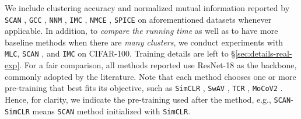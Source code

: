\documentclass[10pt,twocolumn,letterpaper]{article}
\newcommand{\ours}{MLC}
\newcommand{\mours}{\texttt{\ours}}
\begin{document}
   
    We include clustering accuracy and normalized mutual information reported by \texttt{SCAN} \cite{Van_Gansbeke2020-eo}, \texttt{GCC} \cite{Zhong2021-gl}, \texttt{NNM} \cite{Dang2021-no}, \texttt{IMC} \cite{Ntelemis2021-gz}, \texttt{NMCE} \cite{Li2022-vq}, \texttt{SPICE} \cite{Niu2022-iq} on aforementioned datasets whenever applicable. In addition, to \textit{compare the running time} as well as to have more baseline methods when there are \textit{many clusters}, we conduct experiments with \mours{}, \texttt{SCAN} \cite{Van_Gansbeke2020-eo}, and \texttt{IMC} \cite{Ntelemis2021-gz} on CIFAR-100. Training details are left to \S \ref{sec:details-real-exp}. 
   For a fair comparison, all methods reported use ResNet-18 as the backbone, commonly adopted by the literature. Note that each method chooses one or more pre-training that best fits its objective, such as \texttt{SimCLR} \cite{chen2020simple}, \texttt{SwAV} \cite{Caron2020-el}, \texttt{TCR} \cite{Li2022-vq}, \texttt{MoCoV2} \cite{Chen2020-ws}. Hence, for clarity, we indicate the pre-training used after the method, e.g., \texttt{SCAN}-\texttt{SimCLR} means \texttt{SCAN} method initialized with \texttt{SimCLR}. 

   
   
   
   
   
   
   

   
   
\end{document}
